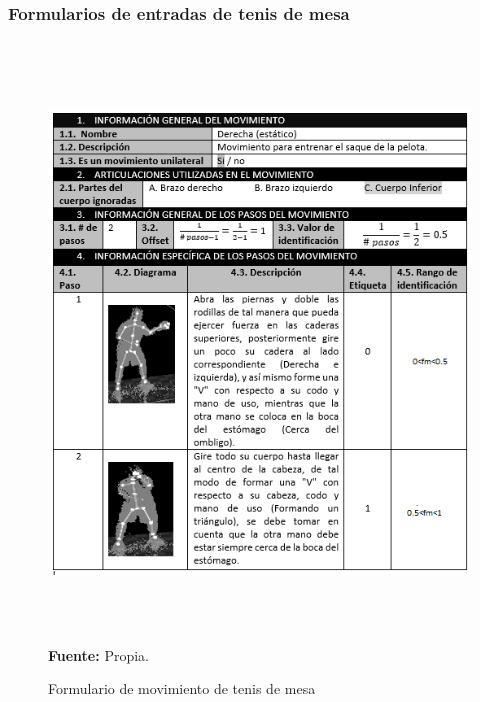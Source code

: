 \subsubsection{Formularios de entradas de tenis de mesa}
\begin{figure}[H]
	\caption{Formulario de movimiento de tenis de mesa}
	\label{fig:frmMovTen}
	\centering	\includegraphics[width=445px,height=600px]{graphics/resultados/movimientoTenis.PNG} \\
	\textbf{Fuente:} Propia.
\end{figure}
